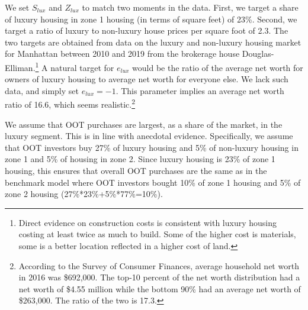 \documentclass[letterpaper,12pt,dvipsnames,usenames]{article}
\theoremstyle{definition}
\begin{document}
\begin{spacing}{1.25}
{We set $S_{lux}$ and $Z_{lux}$ to match two moments in the data. First, we target a share of luxury housing in zone 1 housing (in terms of square feet) of 23\%. Second, we target a ratio of luxury to non-luxury house prices per square foot of 2.3. The two targets are obtained from data on the luxury and non-luxury housing market for Manhattan between 2010 and 2019 from the brokerage house Douglas-Elliman.\footnote{Direct evidence on construction costs is consistent with luxury housing costing at least twice as much to build. Some of the higher cost is materials, some is a better location reflected in a higher cost of land.} A natural target for $e_{lux}$ would be the ratio of the average net worth for owners of luxury housing to average net worth for everyone else. We lack such data, and simply set $e_{lux}=-1$. This parameter implies an average net worth ratio of 16.6, which seems realistic.\footnote{According to the Survey of Consumer Finances, average household net worth in 2016 was \$692,000. The top-10 percent of the net worth distribution had a net worth of \$4.55 million while the bottom 90\% had an average net worth of \$263,000. The ratio of the two is 17.3. }

We assume that OOT purchases are largest, as a share of the market, in the luxury segment. This is in line with anecdotal evidence. Specifically, we assume that OOT investors buy 27\% of luxury housing and 5\% of non-luxury housing in zone 1 and 5\% of housing in zone 2. Since luxury housing is 23\% of zone 1 housing, this ensures that overall OOT purchases are the same as in the benchmark model where OOT investors bought 10\% of zone 1 housing and 5\% of zone 2 housing (27\%*23\%+5\%*77\%=10\%).

}
\end{spacing}
\end{document}
